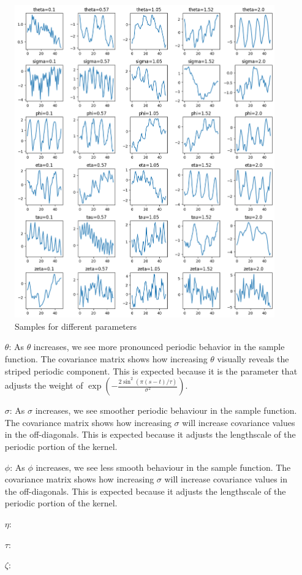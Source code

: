 \documentclass[12pt]{article}
\begin{document}
\begin{figure}[h]
\begin{minipage}{.5\textwidth}
\includegraphics[scale = 0.35]{outputs/q2/c-parameter-samples}
\caption{Samples for different parameters}
\label{fig:fig2-c-parameter-samples}
\end{minipage}
\end{figure}

\begin{itemize}
\item [$\theta$:] As $\theta$ increases, we see more pronounced periodic behavior in the sample function.
    The covariance matrix shows how increasing $\theta$ visually reveals the striped periodic component.
        This is expected because it is the parameter that adjusts the weight of $\exp\left( - \frac{2\sin^2(\pi(s-t)/\tau)}{\sigma^2}\right)$.
\item [$\sigma$:] As $\sigma$ increases, we see smoother periodic behaviour in the sample function.
    The covariance matrix shows how increasing $\sigma$ will increase covariance values in the off-diagonals.
    This is expected because it adjusts the lengthscale of the periodic portion of the kernel.
\item [$\phi$:] As $\phi$ increases, we see less smooth behaviour in the sample function.
    The covariance matrix shows how increasing $\sigma$ will increase covariance values in the off-diagonals.
    This is expected because it adjusts the lengthscale of the periodic portion of the kernel.
\item [$\eta$:]
\item [$\tau$:]
\item [$\zeta$:]
\end{itemize}
\newpage
\end{document}
